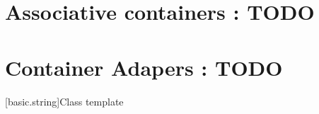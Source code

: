 \documentclass{wg21}
\begin{document}
%
%
%
%
%
%
%    

\section{Associative containers : TODO}

\section{Container Adapers : TODO}

[basic.string]{Class template }
\end{document}
